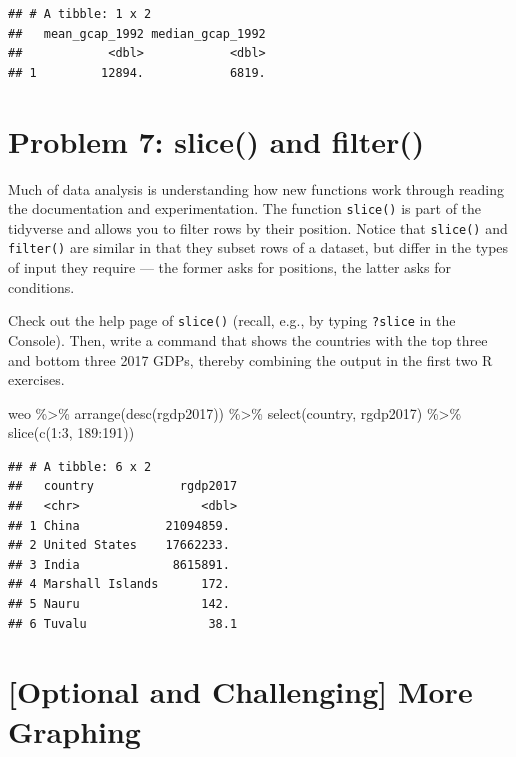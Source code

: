 \documentclass[11pt]{article}
\newcommand{\code}[1]{\colorbox{light-gray}{\texttt{#1}}}
\newenvironment{Shaded}{\begin{snugshade}}{\end{snugshade}}
\newcommand{\DecValTok}[1]{\textcolor[rgb]{0.00,0.00,0.81}{#1}}
\newcommand{\FunctionTok}[1]{\textcolor[rgb]{0.00,0.00,0.00}{#1}}
\newcommand{\NormalTok}[1]{#1}
\newcommand{\SpecialCharTok}[1]{\textcolor[rgb]{0.00,0.00,0.00}{#1}}
\begin{document}
\begin{verbatim}
## # A tibble: 1 x 2
##   mean_gcap_1992 median_gcap_1992
##            <dbl>            <dbl>
## 1         12894.            6819.
\end{verbatim}

\hypertarget{problem-7-slice-and-filter}{%
\section*{Problem 7: slice() and
filter()}\label{problem-7-slice-and-filter}}

Much of data analysis is understanding how new functions work through
reading the documentation and experimentation. The function
\code{slice()} is part of the tidyverse and allows you to filter rows by
their position. Notice that \code{slice()} and \code{filter()} are
similar in that they subset rows of a dataset, but differ in the types
of input they require --- the former asks for positions, the latter asks
for conditions.

Check out the help page of \code{slice()} (recall, e.g., by typing
\code{?slice} in the Console). Then, write a command that shows the
countries with the top three and bottom three 2017 GDPs, thereby
combining the output in the first two R exercises.

\begin{Shaded}
\begin{Highlighting}[]
\NormalTok{weo }\SpecialCharTok{\%\textgreater{}\%}
 \FunctionTok{arrange}\NormalTok{(}\FunctionTok{desc}\NormalTok{(rgdp2017)) }\SpecialCharTok{\%\textgreater{}\%}
 \FunctionTok{select}\NormalTok{(country, rgdp2017) }\SpecialCharTok{\%\textgreater{}\%}
 \FunctionTok{slice}\NormalTok{(}\FunctionTok{c}\NormalTok{(}\DecValTok{1}\SpecialCharTok{:}\DecValTok{3}\NormalTok{, }\DecValTok{189}\SpecialCharTok{:}\DecValTok{191}\NormalTok{))}
\end{Highlighting}
\end{Shaded}

\begin{verbatim}
## # A tibble: 6 x 2
##   country            rgdp2017
##   <chr>                 <dbl>
## 1 China            21094859. 
## 2 United States    17662233. 
## 3 India             8615891. 
## 4 Marshall Islands      172. 
## 5 Nauru                 142. 
## 6 Tuvalu                 38.1
\end{verbatim}

\hypertarget{optional-and-challenging-more-graphing}{%
\section*{{[}Optional and Challenging{]} More
Graphing}\label{optional-and-challenging-more-graphing}}
\end{document}
